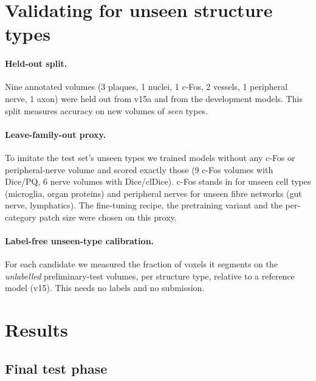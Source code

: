 \documentclass[11pt,a4paper]{article}
\begin{document}
\section{Validating for unseen structure types}
\label{sec:validation}

\paragraph{Held-out split.} Nine annotated volumes (3 plaques, 1 nuclei, 1 c-Fos, 2 vessels, 1 peripheral nerve, 1 axon) were held out from v15a and from the development models. This split measures accuracy on new volumes of \emph{seen} types.

\paragraph{Leave-family-out proxy.} To imitate the test set's unseen types we trained models without any c-Fos or peripheral-nerve volume and scored exactly those (9 c-Fos volumes with Dice/PQ, 6 nerve volumes with Dice/clDice). c-Fos stands in for unseen cell types (microglia, organ proteins) and peripheral nerves for unseen fibre networks (gut nerve, lymphatics). The fine-tuning recipe, the pretraining variant and the per-category patch size were chosen on this proxy.

\paragraph{Label-free unseen-type calibration.} For each candidate we measured the fraction of voxels it segments on the \emph{unlabelled} preliminary-test volumes, per structure type, relative to a reference model (v15). This needs no labels and no submission.

\section{Results}

\subsection{Final test phase}

\begin{table}[!htbp]
\centering\small
\caption{Final-test metrics of our two entries (mean\,$\pm$\,s.d.\ over test volumes).}
\label{tab:final}
\end{table}
\end{document}
